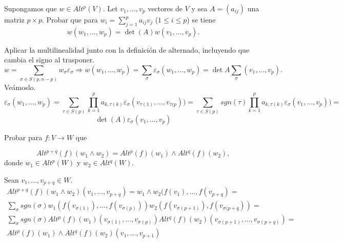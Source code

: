 \documentclass[twoside]{article}
\begin{document}
\newpage

\begin{ejercicio}{2.6}
Supongamos que $w\in Alt^p(V)$. Let $v_1,\dots, v_p$ vectores de $V$ y sea $A=(a_{ij})$ una matriz $p\times p$. Probar que para $w_i=\sum_{j=1}^pa_{ij}v_j$ ($1\leq i\leq p$) se tiene
$$w(w_1,\dots, w_p)=\det(A)w(v_1,\dots, v_p).$$
\end{ejercicio}
\begin{solucion}
Aplicar la multilinealidad junto con la definición de alternado, incluyendo que cambia el signo al trasponer.
\[
w=\sum_{\sigma\in S(p,n-p)} w_{\sigma}\varepsilon_{\sigma}\Rightarrow w(w_1,\dots, w_p)=\sum_{\sigma}\varepsilon_{\sigma}(w_1,\dots, w_p)=\det A\sum_{\sigma}(v_1,\dots, v_p). 
\]
Veámoslo.
\[
\varepsilon_{\sigma}(w_1,\dots, w_p)=\sum_{\tau\in S(p)}\prod_{k=1}^p a_{k,\tau(k)} \varepsilon_{\sigma}(v_{\tau(1)},\dots, v_{\tau(p}))=\sum_{\tau\in S(p)}sgn(\tau)\prod_{k=1}^p a_{k,\tau(k)} \varepsilon_{\sigma} (v_{1},\dots, v_{p}))=
\]
\[
\det(A)\varepsilon_{\sigma}(v_1,\dots, v_p)
\]
\end{solucion}

\newpage

\begin{ejercicio}{2.7}
Probar para $f:V\to W$ que

$$Alt^{p+q}(f)(w_1\land w_2)=Alt^p(f)(w_1)\land Alt^q(f)(w_2),$$
donde $w_1\in Alt^p(W)$ y $w_2\in Alt^q(W)$.
\end{ejercicio}
\begin{solucion}
Sean $v_1,\dots, v_{p+q}\in W$. 
\begin{gather*}
Alt^{p+q}(f)(w_1\land w_2)(v_1,\dots, v_{p+q})=w_1\land w_2(f(v_1),\dots, f(v_{p+q})=\\
\sum_{\sigma}sgn(\sigma)w_1(f(v_{\sigma(1)}),\dots, f(v_{\sigma(p)}))w_2(f(v_{\sigma(p+1)}),f(v_{\sigma(p+q}))=\\
\sum_{\sigma}sgn(\sigma) Alt^p(f)(w_1)(v_{\sigma(1)},\dots, v_{\sigma(p)})Alt^q(f)(w_2)(v_{\sigma(p+1)},\dots, v_{\sigma(p+q)})=\\
Alt^p(f)(w_1)\land Alt^q(f)(w_2)(v_1,\dots, v_{p+1})
\end{gather*}
\end{solucion}

\newpage
\end{document}
